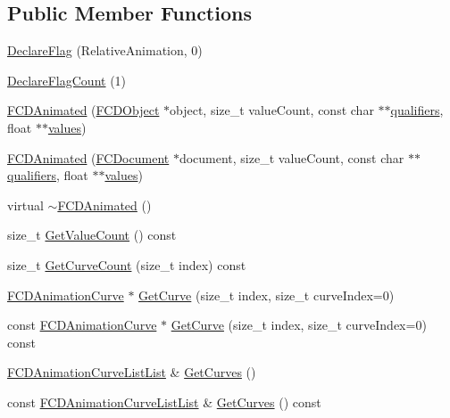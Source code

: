\subsection*{Public Member Functions}
\begin{DoxyCompactItemize}
\item 
\hyperlink{classFCDAnimated_ac837003f50e0f80a8931fbc81e26a58f}{DeclareFlag} (RelativeAnimation, 0)
\item 
\hyperlink{classFCDAnimated_a4eda43378afc55e11489da7b9dc2dcd2}{DeclareFlagCount} (1)
\item 
\hyperlink{classFCDAnimated_a167d5abc5e40cf3fc4324bb03c745e36}{FCDAnimated} (\hyperlink{classFCDObject}{FCDObject} $\ast$object, size\_\-t valueCount, const char $\ast$$\ast$\hyperlink{classFCDAnimated_a02ab9175d25055cd2d10d924de312490}{qualifiers}, float $\ast$$\ast$\hyperlink{classFCDAnimated_afa9e0b280ba2cd7c18e8454eb296e453}{values})
\item 
\hyperlink{classFCDAnimated_a9b99432d57703358264e5cf4db911570}{FCDAnimated} (\hyperlink{classFCDocument}{FCDocument} $\ast$document, size\_\-t valueCount, const char $\ast$$\ast$\hyperlink{classFCDAnimated_a02ab9175d25055cd2d10d924de312490}{qualifiers}, float $\ast$$\ast$\hyperlink{classFCDAnimated_afa9e0b280ba2cd7c18e8454eb296e453}{values})
\item 
virtual \hyperlink{classFCDAnimated_a8f3542f8832c28a2ac577eae2b63304b}{$\sim$FCDAnimated} ()
\item 
size\_\-t \hyperlink{classFCDAnimated_ab327a9cd5a07649b00105ee399926b86}{GetValueCount} () const 
\item 
size\_\-t \hyperlink{classFCDAnimated_aed087870f52e45cb31f0671739fdd22a}{GetCurveCount} (size\_\-t index) const 
\item 
\hyperlink{classFCDAnimationCurve}{FCDAnimationCurve} $\ast$ \hyperlink{classFCDAnimated_a1f001d1c8c99792304bddc3e4940d239}{GetCurve} (size\_\-t index, size\_\-t curveIndex=0)
\item 
const \hyperlink{classFCDAnimationCurve}{FCDAnimationCurve} $\ast$ \hyperlink{classFCDAnimated_a7ed98f7465fc04cee9d1daf463719f05}{GetCurve} (size\_\-t index, size\_\-t curveIndex=0) const 
\item 
\hyperlink{classfm_1_1vector}{FCDAnimationCurveListList} \& \hyperlink{classFCDAnimated_ad2ed5c2ba6f42d423b28025cf6f10090}{GetCurves} ()
\item 
const \hyperlink{classfm_1_1vector}{FCDAnimationCurveListList} \& \hyperlink{classFCDAnimated_a68b8b307c20c21ad2172cab63e97805a}{GetCurves} () const 

\end{DoxyCompactItemize}
